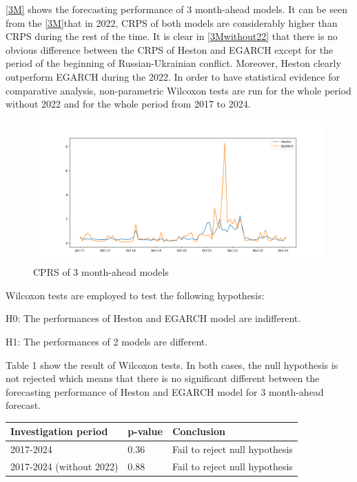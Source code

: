 \documentclass[12pt,a4paper]{article}
\newcommand\colorAutoref[1]{{\hypersetup{linkcolor=black}\autoref{#1}}}
\numberwithin{equation}{section}
\begin{document}
 \colorAutoref{3M} shows the forecasting performance of 3 month-ahead models. It can be seen from the \colorAutoref{3M}that in 2022, CRPS of both models are considerably higher than CRPS during the rest of the time. It is clear in \colorAutoref{3Mwithout22} that there is no obvious difference between the CRPS of Heston and EGARCH except for the period of the beginning of Russian-Ukrainian conflict. Moreover, Heston clearly outperform EGARCH during the 2022. In order to have statistical evidence for comparative analysis, non-parametric Wilcoxon tests are run for the whole period without 2022 and for the whole period from 2017 to 2024. 
 

\begin{figure}[h!] 
\includegraphics[scale=1,width=1\linewidth,height=0.3\textheight]{threemonthahead.png}
\caption{CPRS of 3 month-ahead models}
\label{3M}
\end{figure}


Wilcoxon tests are employed to test the following hypothesis:

H0: The performances of Heston and EGARCH model are indifferent.

H1: The performances of 2 models are different.

Table 1 show the result of Wilcoxon tests. In both cases, the null hypothesis is not rejected which means that there is no significant different between the forecasting performance of Heston and EGARCH model for 3 month-ahead forecast.


\begin{table}[h!]
\centering
\begin{tabular}{@{}lll@{}}
\toprule
Investigation period     & p-value & Conclusion                     \\ \midrule
2017-2024                & 0.36    & Fail to reject null hypothesis \\
2017-2024 (without 2022) & 0.88    & Fail to reject null hypothesis \\ \bottomrule
\end{tabular}
\end{table}
\end{document}
